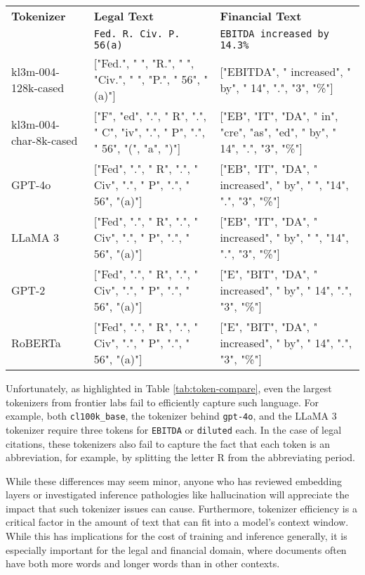 \begin{table*}[h!]
\centering
\small
\caption{Tokenization comparison across domains}
\label{tab:token-compare}
\begin{tabular}{p{2.5cm}p{7cm}p{7cm}}
\toprule
\textbf{Tokenizer} & \textbf{Legal Text} & \textbf{Financial Text} \\
& \texttt{Fed. R. Civ. P. 56(a)} & \texttt{EBITDA increased by 14.3\%} \\
\midrule
kl3m-004-128k-cased & ["Fed.", " ", "R.", " ", "Civ.", " ", "P.", " 56", "(a)"] & ["EBITDA", " increased", " by", " 14", ".", "3", "\%"] \\
\midrule
kl3m-004-char-8k-cased & ["F", "ed", ".", " R", ".", " C", "iv", ".", " P", ".", " 56", "(", "a", ")"] & ["EB", "IT", "DA", " in", "cre", "as", "ed", " by", " 14", ".", "3", "\%"] \\
\midrule
GPT-4o & ["Fed", ".", " R", ".", " Civ", ".", " P", ".", " 56", "(a)"] & ["EB", "IT", "DA", " increased", " by", " ", "14", ".", "3", "\%"] \\
\midrule
LLaMA 3 & ["Fed", ".", " R", ".", " Civ", ".", " P", ".", " 56", "(a)"] & ["EB", "IT", "DA", " increased", " by", " ", "14", ".", "3", "\%"] \\
\midrule
GPT-2 & ["Fed", ".", " R", ".", " Civ", ".", " P", ".", " 56", "(a)"] & ["E", "BIT", "DA", " increased", " by", " 14", ".", "3", "\%"] \\
\midrule
RoBERTa & ["Fed", ".", " R", ".", " Civ", ".", " P", ".", " 56", "(a)"] & ["E", "BIT", "DA", " increased", " by", " 14", ".", "3", "\%"] \\
\bottomrule
\end{tabular}
\end{table*}

Unfortunately, as highlighted in Table \ref{tab:token-compare}, even the largest tokenizers from frontier labs fail to efficiently capture such language.  For example, both \texttt{cl100k\_base}, the tokenizer behind \texttt{gpt-4o}, and the LLaMA 3 tokenizer require three tokens for \texttt{EBITDA} or \texttt{diluted} each.  In the case of legal citations, these tokenizers also fail to capture the fact that each token is an abbreviation, for example, by splitting the letter R from the abbreviating period.

While these differences may seem minor, anyone who has reviewed embedding layers or investigated inference pathologies like hallucination will appreciate the impact that such tokenizer issues can cause.  Furthermore, tokenizer efficiency is a critical factor in the amount of text that can fit into a model's context window.  While this has implications for the cost of training and inference generally, it is especially important for the legal and financial domain, where documents often have both more words and longer words than in other contexts.

